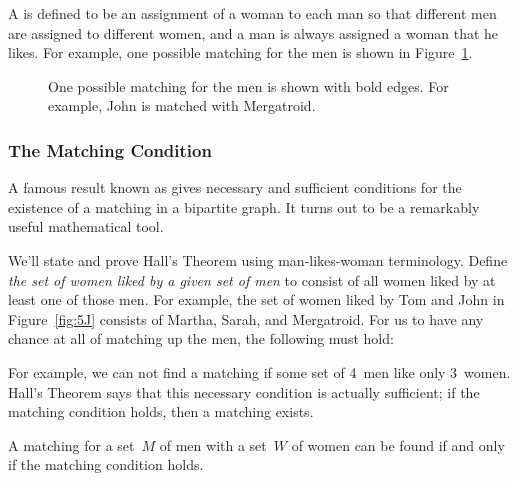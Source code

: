 A  is defined to be an assignment of a woman to each
man so that different men are assigned to different women, and a man
is always assigned a woman that he likes.  For example, one possible
matching for the men is shown in Figure~\ref{fig:5K}.

\begin{figure}



\caption{One possible matching for the men is shown with bold edges.
  For example, John is matched with Mergatroid.}

\label{fig:5K}

\end{figure}

\subsubsection{The Matching Condition}

A famous result known as  gives necessary
and sufficient conditions for the existence of a matching in a
bipartite graph.  It turns out to be a remarkably useful mathematical
tool.

We'll state and prove Hall's Theorem using man-likes-woman
terminology.  Define \emph{the set of women liked by a given set of
  men} to consist of all women liked by at least one of those men.
For example, the set of women liked by Tom and John in
Figure~\ref{fig:5J} consists of Martha, Sarah, and Mergatroid.  For us
to have any chance at all of matching up the men, the following
 must hold:

\medskip

\noindent{}

\medskip

For example, we can not find a matching if some set of 4~men like only
3~women.  Hall's Theorem says that this necessary condition is
actually sufficient; if the matching condition holds, then a matching
exists.

\begin{theorem}\label{thm:matching}
  A matching for a set~$M$ of men with a set~$W$ of women can be found if
  and only if the matching condition holds.
\end{theorem}

